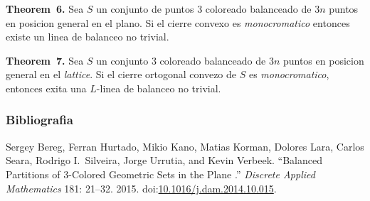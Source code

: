 \documentclass[xcolor=table]{beamer}
\begin{document}
\begin{mdframe}%

\begin{mdbmarginx}{1ex}{0pt}{1ex}{0pt}%
\noindent{}\textbf{Theorem~6.} \mdbr
{}  Sea $S$ un conjunto de puntos 3 coloreado balanceado de $3n$ puntos en posicion general
  en el plano. Si el cierre convexo es \emph{monocromatico} entonces existe un linea de balanceo
  no trivial.%
\end{mdbmarginx}%
\end{mdframe}%

\begin{mdframe}%

\begin{mdbmarginx}{1ex}{0pt}{1ex}{0pt}%
\noindent{}\textbf{Theorem~7.} \mdbr
{}Sea $S$ un conjunto 3 coloreado balanceado de $3n$ puntos en posicion general en el \emph{lattice}.
Si el cierre ortogonal convezo de $S$ es \emph{monocromatico}, entonces exita una $L$-linea de balanceo
no trivial.%
\end{mdbmarginx}%
\end{mdframe}%

\begin{mdframe}%

\frametitle{Bibliografia}\label{heading-sec-bibliografia}%

{%
\begin{thebibliography}{1}%
\label{sec-bibliography}%

\mdbibitemlabel{{}[1]}Sergey Bereg, Ferran Hurtado, Mikio Kano, Matias Korman, Dolores Lara, Carlos Seara, Rodrigo I.~Silveira, Jorge Urrutia, and Kevin Verbeek. \textquotedblleft{}Balanced Partitions of 3-Colored Geometric Sets in the Plane .\textquotedblright{} \emph{Discrete Applied Mathematics } 181: 21–32. 2015. doi:\href{https://dx.doi.org/10.1016/j.dam.2014.10.015}{10.1016/j.dam.2014.10.015}.\label{bereg201521}%
\par%
\end{thebibliography}}%
\end{mdframe}\label{sec-bibliografia}%
\end{document}
